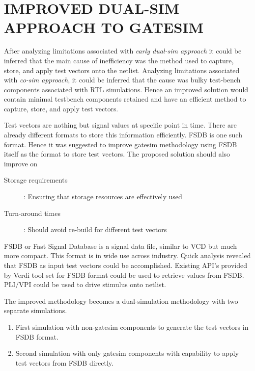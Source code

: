 \chapter{IMPROVED DUAL-SIM APPROACH TO GATESIM}
\label{chap:dualsim.tex}
After analyzing limitations associated with \emph{early dual-sim approach} it could be inferred that the main cause of inefficiency was the method used to capture, store, and apply test vectors onto the netlist. Analyzing limitations associated with \emph{co-sim approach}, it could be inferred that the cause was bulky test-bench components associated with RTL simulations. Hence an improved solution would contain minimal testbench components retained and have an efficient method to capture, store, and apply test vectors. 

Test vectors are nothing but signal values at specific point in time. There are already different formats to store this information efficiently. FSDB  is one such format. Hence it was suggested to improve gatesim methodology using FSDB itself as the format to store test vectors. The proposed solution should also improve on

\begin{description}
	\item[Storage requirements]: Ensuring that storage resources are effectively used
	\item[Turn-around times]: Should avoid re-build for different test vectors
\end{description}

FSDB\cite{SS:Verdi} or Fast Signal Database is a signal data file, similar to VCD\cite{ieee:v:2005}  but much more compact. This format is in wide use across industry. Quick analysis revealed that FSDB as input test vectors could be accomplished. Existing API's  provided by Verdi\cite{SS:Verdi} tool set for FSDB format could be used to retrieve values from FSDB. PLI$/$VPI\cite{ieee:v:2005} could be used to drive stimulus onto netlist.


The improved methodology becomes a dual-simulation methodology with two separate simulations.
\begin{enumerate}
	\item First simulation with non-gatesim components to generate the test vectors in FSDB format.
	\item Second simulation with only gatesim components with capability to apply test vectors from FSDB directly.
\end{enumerate}



